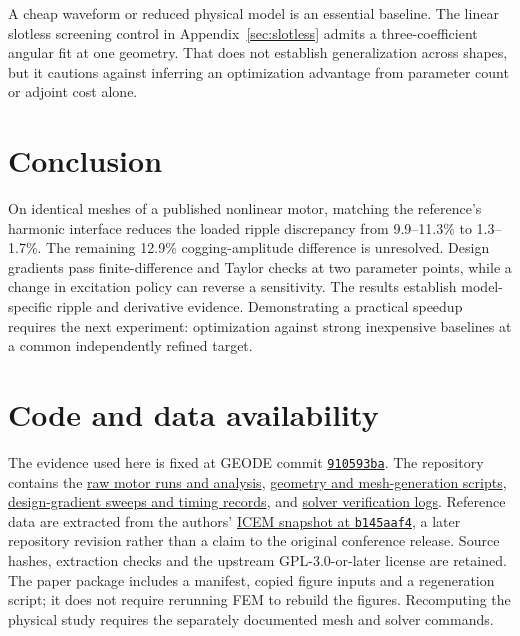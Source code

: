 \documentclass{anvil-paper}
\begin{document}
A cheap waveform or reduced physical model is an essential baseline.
The linear slotless screening control in Appendix~\ref{sec:slotless}
admits a three-coefficient angular fit at one geometry. That does not
establish generalization across shapes, but it cautions against inferring
an optimization advantage from parameter count or adjoint cost alone.

\section{Conclusion}
On identical meshes of a published nonlinear motor, matching the
reference's harmonic interface reduces the loaded ripple discrepancy
from 9.9--11.3\% to 1.3--1.7\%. The remaining 12.9\% cogging-amplitude
difference is unresolved. Design gradients pass finite-difference and
Taylor checks at two parameter points, while a change in excitation
policy can reverse a sensitivity. The results establish model-specific
ripple and derivative evidence. Demonstrating a practical speedup requires
the next experiment: optimization against strong inexpensive baselines
at a common independently refined target.

\section*{Code and data availability}
The evidence used here is fixed at GEODE commit
\href{https://github.com/rjwalters/geode-fem/tree/910593bad6f64f9f01671c2632b57034e72b9c61}{\texttt{910593ba}}.
The repository contains the
\href{https://github.com/rjwalters/geode-fem/tree/910593bad6f64f9f01671c2632b57034e72b9c61/benchmarks/motor_reference/forward_harmonic}{raw motor runs and analysis},
\href{https://github.com/rjwalters/geode-fem/tree/910593bad6f64f9f01671c2632b57034e72b9c61/benchmarks/motor_reference/geometry}{geometry and mesh-generation scripts},
\href{https://github.com/rjwalters/geode-fem/tree/910593bad6f64f9f01671c2632b57034e72b9c61/benchmarks/motor_shape_gradient/design}{design-gradient sweeps and timing records},
and \href{https://github.com/rjwalters/geode-fem/tree/910593bad6f64f9f01671c2632b57034e72b9c61/benchmarks/motor_nonlinear_m1}{solver verification logs}.
Reference data are extracted from the authors'
\href{https://github.com/MichaelWiesheu/ICEMsnapshot/tree/b145aaf4ab1a6424828bc941eaf172f48fa0d458}{ICEM snapshot at \texttt{b145aaf4}},
a later repository revision rather than a claim to the original conference
release. Source hashes, extraction checks and the upstream GPL-3.0-or-later license
are retained. The paper package includes a manifest, copied figure inputs
and a regeneration script; it does not require rerunning FEM to rebuild
the figures. Recomputing the physical study requires the separately
documented mesh and solver commands.
\end{document}
